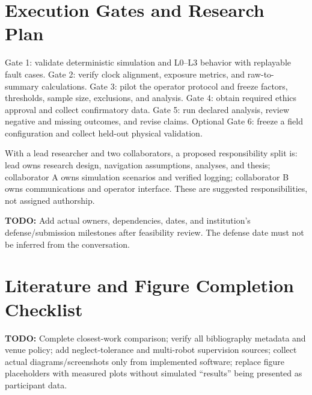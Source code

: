 \documentclass[12pt,oneside]{report}
\newcommand{\todo}[1]{\par\noindent\textcolor{red!65!black}{\textbf{TODO:} #1}\par}
\begin{document}
\chapter{Execution Gates and Research Plan}
Gate 1: validate deterministic simulation and L0--L3 behavior with replayable fault cases. Gate 2: verify clock alignment, exposure metrics, and raw-to-summary calculations. Gate 3: pilot the operator protocol and freeze factors, thresholds, sample size, exclusions, and analysis. Gate 4: obtain required ethics approval and collect confirmatory data. Gate 5: run declared analysis, review negative and missing outcomes, and revise claims. Optional Gate 6: freeze a field configuration and collect held-out physical validation.

With a lead researcher and two collaborators, a proposed responsibility split is: lead owns research design, navigation assumptions, analyses, and thesis; collaborator A owns simulation scenarios and verified logging; collaborator B owns communications and operator interface. These are suggested responsibilities, not assigned authorship. \todo{Add actual owners, dependencies, dates, and institution's defense/submission milestones after feasibility review. The defense date must not be inferred from the conversation.}
\chapter{Literature and Figure Completion Checklist}
\todo{Complete closest-work comparison; verify all bibliography metadata and venue policy; add neglect-tolerance and multi-robot supervision sources; collect actual diagrams/screenshots only from implemented software; replace figure placeholders with measured plots without simulated ``results'' being presented as participant data.}

\end{document}
